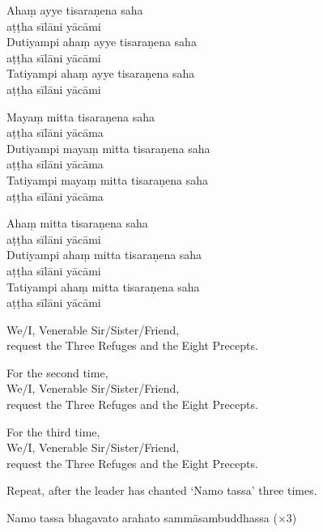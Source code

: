 
Ahaṃ ayye tisaraṇena saha\\\vin aṭṭha sīlāni yācāmi\\
Dutiyampi ahaṃ ayye tisaraṇena saha\\\vin aṭṭha sīlāni yācāmi\\
Tatiyampi ahaṃ ayye tisaraṇena saha\\\vin aṭṭha sīlāni yācāmi


Mayaṃ mitta tisaraṇena saha\\\vin aṭṭha sīlāni yācāma\\
Dutiyampi mayaṃ mitta tisaraṇena saha\\\vin aṭṭha sīlāni yācāma\\
Tatiyampi mayaṃ mitta tisaraṇena saha\\\vin aṭṭha sīlāni yācāma

\ifhandbookedition
\enlargethispage{\baselineskip}
\fi


Ahaṃ mitta tisaraṇena saha\\\vin aṭṭha sīlāni yācāmi\\
Dutiyampi ahaṃ mitta tisaraṇena saha\\\vin aṭṭha sīlāni yācāmi\\
Tatiyampi ahaṃ mitta tisaraṇena saha\\\vin aṭṭha sīlāni yācāmi

\begin{english}
  We/I, Venerable Sir/Sister/Friend,\\
  request the Three Refuges and the Eight Precepts.

  For the second time,\\
  We/I, Venerable Sir/Sister/Friend,\\
  request the Three Refuges and the Eight Precepts.

  For the third time,\\
  We/I, Venerable Sir/Sister/Friend,\\
  request the Three Refuges and the Eight Precepts.
\end{english}

\begin{instruction}
  Repeat, after the leader has chanted ‘Namo tassa’ three times.
\end{instruction}

Namo tassa bhagavato arahato sammāsambuddhassa (×3)

